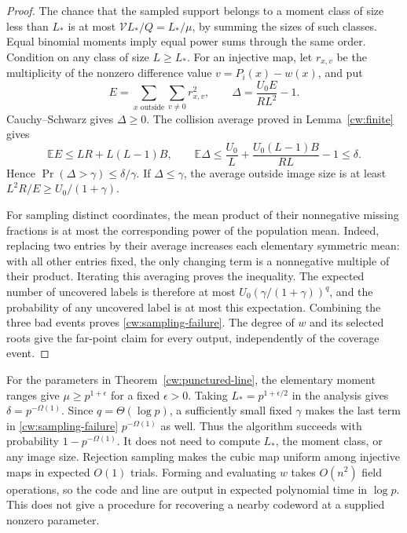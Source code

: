 \begin{proof}
The chance that the sampled support belongs to a moment class of size
less than $L_*$ is at most $\mathcal V L_*/Q=L_*/\mu$, by summing
the sizes of such classes. Equal binomial moments imply equal power
sums through the same order. Condition on any class of size $L\ge L_*$.
For an injective map, let $r_{x,v}$ be the multiplicity of the nonzero
difference value $v=P_i(x)-w(x)$, and put
\[
 E=\sum_{x\text{ outside}}\sum_{v\ne0}r_{x,v}^2,
 \qquad \Delta=\frac{U_0E}{RL^2}-1.
\]
Cauchy--Schwarz gives $\Delta\ge0$. The collision average proved in
Lemma~\ref{cw:finite} gives
\[
 \mathbb E E\le LR+L(L-1)B,
 \qquad
 \mathbb E\Delta\le\frac{U_0}{L}
       +\frac{U_0(L-1)B}{RL}-1\le\delta.
\]
Hence $\Pr(\Delta>\gamma)\le\delta/\gamma$.
If $\Delta\le\gamma$, the average outside image size is at least
$L^2R/E\ge U_0/(1+\gamma)$.

For sampling distinct coordinates, the mean product of their
nonnegative missing fractions is at most the corresponding power of
the population mean. Indeed, replacing two entries by their average
increases each elementary symmetric mean: with all other entries fixed,
the only changing term is a nonnegative multiple of their product.
Iterating this averaging proves the inequality. The expected number
of uncovered labels is therefore at most
$U_0(\gamma/(1+\gamma))^q$, and the probability of any uncovered label
is at most this expectation. Combining the three bad events proves
\eqref{cw:sampling-failure}. The degree of $w$ and its selected roots
give the far-point claim for every output, independently of the
coverage event.
\end{proof}

For the parameters in Theorem~\ref{cw:punctured-line}, the elementary
moment ranges give $\mu\ge p^{1+\epsilon}$ for a fixed $\epsilon>0$.
Taking $L_*=p^{1+\epsilon/2}$ in the analysis gives
$\delta=p^{-\Omega(1)}$. Since $q=\Theta(\log p)$, a sufficiently small
fixed $\gamma$ makes the last term in \eqref{cw:sampling-failure}
$p^{-\Omega(1)}$ as well. Thus the algorithm succeeds with probability
$1-p^{-\Omega(1)}$. It does not need to compute $L_*$, the moment class,
or any image size. Rejection sampling makes the cubic map uniform
among injective maps in expected $O(1)$ trials. Forming and evaluating
$w$ takes $O(n^2)$ field operations, so the code and line are output
in expected polynomial time in $\log p$. This does not give a procedure
for recovering a nearby codeword at a supplied nonzero parameter.

